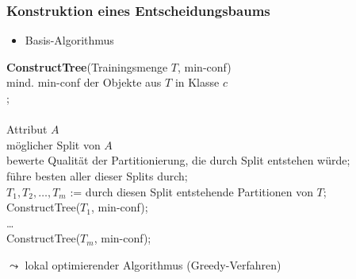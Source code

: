 \begin{frame}
\frametitle{Konstruktion eines Entscheidungsbaums}

\begin{itemize}
\item Basis-Algorithmus
\end{itemize}

\begin{smallalgo}
\textbf{ConstructTree}(Trainingsmenge $T$,  min-conf)\\
\1  \textrm{mind.} min-conf \textrm{der Objekte aus} $T$ \textrm{in Klasse} $c$  \\
\2 ; \\
\1  \\
\2  \textrm{Attribut} $A$  \\
\3  \textrm{möglicher Split von} $A$  \\
\4 \textrm{bewerte Qualität der Partitionierung, die durch Split entstehen
würde}; \\
\2 \textrm{führe besten aller dieser Splits durch}; \\
\2 $T_1, T_2, \dots, T_m$ := \textrm{durch diesen Split entstehende
Partitionen von} $T$; \\
\2 ConstructTree($T_1$, min-conf); \\
\2 \dots \\
\2 ConstructTree($T_m$, min-conf);
\end{smallalgo}

$\leadsto$ lokal optimierender Algorithmus (Greedy-Verfahren)

\end{frame}


